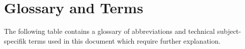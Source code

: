 \chapter*{Glossary and Terms}

The following table contains a glossary of abbreviations and technical subject-specifik terms used in this document which require further explanation. 

\begin{table}[H]  
\centering
{}
\caption {Glossary.} 
\label{tab:table_glossary} 
\end{table}
